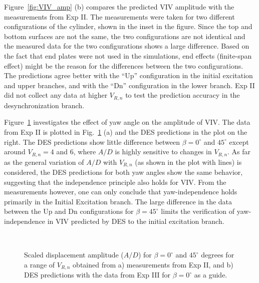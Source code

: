 Figure~\ref{fig:VIV_amp} (b) compares the predicted VIV amplitude with
the measurements from Exp II. The measurements were taken for two different
configurations of the cylinder, shown in the inset in the figure. Since the top
and bottom surfaces are not the same, the two configurations are not identical
and the measured data for the two configurations shows a large difference.
Based on the fact that end plates were not used in the simulations, end effects
(finite-span effect) might be the reason for the differences between the two
configurations.  The predictions agree better with the ``Up'' configuration in
the initial excitation and upper branches, and with the ``Dn'' configuration in
the lower branch. Exp II did not collect any data at higher $V_{R,n}$ to test
the prediction accuracy in the desynchronization branch.

Figure~\ref{fig:VIV_yaw} investigates the effect of yaw angle on the amplitude
of VIV. The data from Exp II is plotted in Fig.~\ref{fig:VIV_yaw} (a) and the
DES predictions in the plot on the right.  The DES predictions show little
difference between $\beta=0^\circ$ and $45^\circ$ except around $V_{R,n}=4$ and
$6$, where $A/D$ is highly sensitive to changes in $V_{R,n}$. As far as the
general variation of $A/D$ with $V_{R,n}$ (as shown in the plot with lines) is
considered, the DES predictions for both yaw angles show the same behavior,
suggesting that the independence principle also holds for VIV. From the
measurements however, one can only conclude that yaw-independence holds
primarily in the Initial Excitation branch. The large difference in the data
between the Up and Dn configurations for $\beta=45^\circ$ limits the
verification of yaw-independence in VIV predicted by DES to the initial
excitation branch.
%
\begin{figure}[htb!]
  \qquad
     {} \\
  \caption{Scaled displacement amplitude ($A/D$) for $\beta=0^\circ$ and
    $45^\circ$ degrees for a range of $V_{R,n}$ obtained from a) measurements
    from Exp II, and b) DES predictions with the data from Exp III for
    $\beta=0^\circ$ as a guide.}
  \label{fig:VIV_yaw}
\end{figure}

